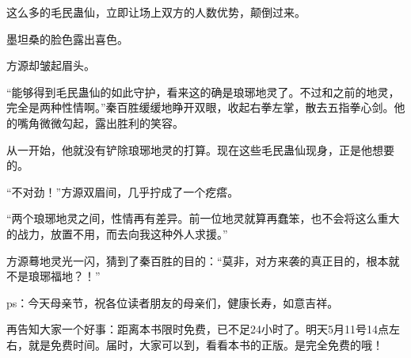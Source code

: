 \begin{this_body}
这么多的毛民蛊仙，立即让场上双方的人数优势，颠倒过来。

墨坦桑的脸色露出喜色。

方源却皱起眉头。

“能够得到毛民蛊仙的如此守护，看来这的确是琅琊地灵了。不过和之前的地灵，完全是两种性情啊。”秦百胜缓缓地睁开双眼，收起右拳左掌，散去五指拳心剑。他的嘴角微微勾起，露出胜利的笑容。

从一开始，他就没有铲除琅琊地灵的打算。现在这些毛民蛊仙现身，正是他想要的。

“不对劲！”方源双眉间，几乎拧成了一个疙瘩。

“两个琅琊地灵之间，性情再有差异。前一位地灵就算再蠢笨，也不会将这么重大的战力，放置不用，而去向我这种外人求援。”

方源蓦地灵光一闪，猜到了秦百胜的目的：“莫非，对方来袭的真正目的，根本就不是琅琊福地？！”

ps：今天母亲节，祝各位读者朋友的母亲们，健康长寿，如意吉祥。

再告知大家一个好事：距离本书限时免费，已不足24小时了。明天5月11号14点左右，就是免费时间。届时，大家可以到，看看本书的正版。是完全免费的哦！

\end{this_body}


